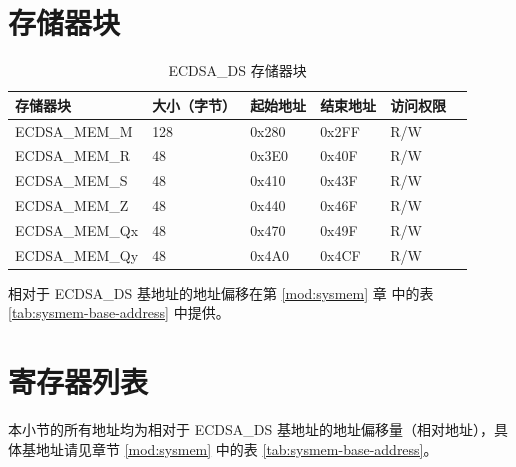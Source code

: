 \documentclass[main\_\_CN.tex]{subfiles}
\begin{document}
\section{存储器块}


\begin{table}[H]
    \centering
    \caption{ECDSA\_DS 存储器块} \label{tab:ecdsa-memory}
    \begin{threeparttable}
    \begin{tabular}{ | l | l | l | l | l | l | }
    \hline
        \rowcolor{lightgray}
        \textbf{存储器块} & \textbf{大小（字节）}  &  \textbf{起始地址}\tnote{*} &  \textbf{结束地址} \tnote{*} & \textbf{访问权限}   \\ \hline
        ECDSA\_MEM\_M    & 128 & 0x280 & 0x2FF & R/W \\ \hline
        ECDSA\_MEM\_R    & 48  & 0x3E0 & 0x40F & R/W \\ \hline
        ECDSA\_MEM\_S    & 48  & 0x410 & 0x43F & R/W \\ \hline
        ECDSA\_MEM\_Z    & 48  & 0x440 & 0x46F & R/W \\ \hline
        ECDSA\_MEM\_Qx   & 48  & 0x470 & 0x49F & R/W \\ \hline
        ECDSA\_MEM\_Qy   & 48  & 0x4A0 & 0x4CF & R/W \\ \hline
    \end{tabular}
    \begin{tablenotes}
        \item[*] 相对于 ECDSA\_DS 基地址的地址偏移在第 \ref{mod:sysmem} 章\textit{} 中的表 \ref{tab:sysmem-base-address} 中提供。
    \end{tablenotes}
    \end{threeparttable}
\end{table}




\newpage
\hypertarget{ecdsa-reg-summ}{}
\section{寄存器列表}
\label{sec:ecdsa-reg-summ}

本小节的所有地址均为相对于 ECDSA\_DS 基地址的地址偏移量（相对地址），具体基地址请见章节 \ref{mod:sysmem} \textit{} 中的表 \ref{tab:sysmem-base-address}。
\end{document}
